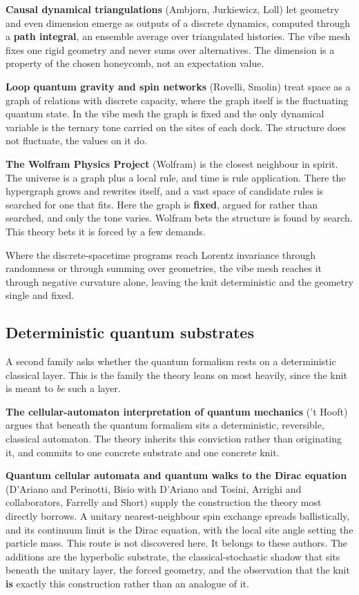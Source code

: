 \textbf{Causal dynamical triangulations} (Ambjorn, Jurkiewicz, Loll) let geometry and even dimension emerge as outputs of a discrete dynamics, computed through a \textbf{path integral}, an ensemble average over triangulated histories. The vibe mesh fixes one rigid geometry and never sums over alternatives. The dimension is a property of the chosen honeycomb, not an expectation value.

\textbf{Loop quantum gravity and spin networks} (Rovelli, Smolin) treat space as a graph of relations with discrete capacity, where the graph itself is the fluctuating quantum state. In the vibe mesh the graph is fixed and the only dynamical variable is the ternary tone carried on the sites of each dock. The structure does not fluctuate, the values on it do.

\textbf{The Wolfram Physics Project} (Wolfram) is the closest neighbour in spirit. The universe is a graph plus a local rule, and time is rule application. There the hypergraph grows and rewrites itself, and a vast space of candidate rules is searched for one that fits. Here the graph is \textbf{fixed}, argued for rather than searched, and only the tone varies. Wolfram bets the structure is found by search. This theory bets it is forced by a few demands.

\begin{principle}
Where the discrete-spacetime programs reach Lorentz invariance through randomness or through summing over geometries, the vibe mesh reaches it through negative curvature alone, leaving the knit deterministic and the geometry single and fixed.
\end{principle}

\subsection{Deterministic quantum substrates}

A second family asks whether the quantum formalism rests on a deterministic classical layer. This is the family the theory leans on most heavily, since the knit is meant to \emph{be} such a layer.

\textbf{The cellular-automaton interpretation of quantum mechanics} ('t Hooft) argues that beneath the quantum formalism sits a deterministic, reversible, classical automaton. The theory inherits this conviction rather than originating it, and commits to one concrete substrate and one concrete knit.

\textbf{Quantum cellular automata and quantum walks to the Dirac equation} (D'Ariano and Perinotti, Bisio with D'Ariano and Tosini, Arrighi and collaborators, Farrelly and Short) supply the construction the theory most directly borrows. A unitary nearest-neighbour spin exchange spreads ballistically, and its continuum limit is the Dirac equation, with the local site angle setting the particle mass. This route is not discovered here. It belongs to these authors. The additions are the hyperbolic substrate, the classical-stochastic shadow that sits beneath the unitary layer, the forced geometry, and the observation that the knit \textbf{is} exactly this construction rather than an analogue of it.

